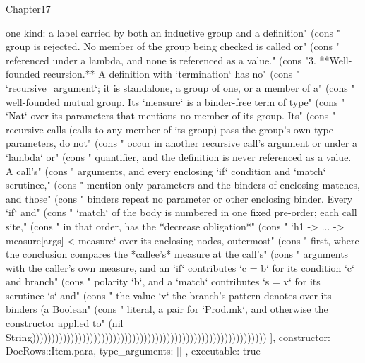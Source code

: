 \begin{lexlean}{Chapter17}
\begin{semanticmodule}
{{one kind: a label carried by both an inductive group and a definition" (cons "   group is rejected. No member of the group being checked is called or" (cons "   referenced under a lambda, and none is referenced as a value." (cons "3. **Well-founded recursion.** A definition with `termination` has no" (cons "   `recursive_argument`; it is standalone, a group of one, or a member of a" (cons "   well-founded mutual group. Its `measure` is a binder-free term of type" (cons "   `Nat` over its parameters that mentions no member of its group. Its" (cons "   recursive calls (calls to any member of its group) pass the group's own type parameters, do not" (cons "   occur in another recursive call's argument or under a `lambda` or" (cons "   quantifier, and the definition is never referenced as a value. A call's" (cons "   arguments, and every enclosing `if` condition and `match` scrutinee," (cons "   mention only parameters and the binders of enclosing matches, and those" (cons "   binders repeat no parameter or other enclosing binder. Every `if` and" (cons "   `match` of the body is numbered in one fixed pre-order; each call site," (cons "   in that order, has the *decrease obligation*" (cons "   `h1 -> ... -> measure[args] < measure` over its enclosing nodes, outermost" (cons "   first, where the conclusion compares the *callee's* measure at the call's" (cons "   arguments with the caller's own measure, and an `if` contributes `c = b` for its condition `c` and branch" (cons "   polarity `b`, and a `match` contributes `s = v` for its scrutinee `s` and" (cons "   the value `v` the branch's pattern denotes over its binders (a Boolean" (cons "   literal, a pair for `Prod.mk`, and otherwise the constructor applied to" (nil String)))))))))))))))))))))))))))))))))))))))))))))))))))))))))))))
    ],
    constructor: DocRows::Item.para,
    type_arguments: []
  },
  executable: true
}


\end{semanticmodule}
\end{lexlean}
